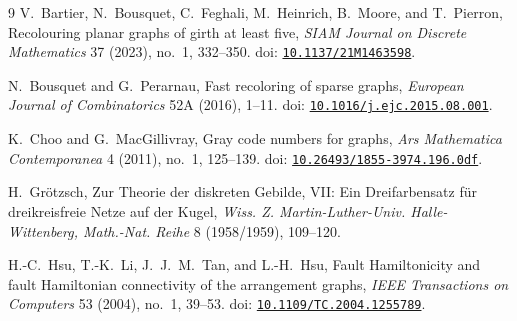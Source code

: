 \documentclass[11pt]{article}
\newcommand{\doi}[1]{doi: \href{https://doi.org/#1}{\nolinkurl{#1}}}
\theoremstyle{remark}
\numberwithin{equation}{section}
\numberwithin{table}{section}
\begin{document}
\begin{thebibliography}{9}
V.~Bartier, N.~Bousquet, C.~Feghali, M.~Heinrich, B.~Moore, and T.~Pierron,
\newblock Recolouring planar graphs of girth at least five,
\newblock \emph{SIAM Journal on Discrete Mathematics} 37 (2023), no.~1, 332--350.
\newblock \doi{10.1137/21M1463598}.

N.~Bousquet and G.~Perarnau,
\newblock Fast recoloring of sparse graphs,
\newblock \emph{European Journal of Combinatorics} 52A (2016), 1--11.
\newblock \doi{10.1016/j.ejc.2015.08.001}.

K.~Choo and G.~MacGillivray,
\newblock Gray code numbers for graphs,
\newblock \emph{Ars Mathematica Contemporanea} 4 (2011), no.~1, 125--139.
\newblock \doi{10.26493/1855-3974.196.0df}.

H.~Gr\"otzsch,
\newblock Zur Theorie der diskreten Gebilde, VII: Ein Dreifarbensatz f\"ur dreikreisfreie Netze auf der Kugel,
\newblock \emph{Wiss. Z. Martin-Luther-Univ. Halle-Wittenberg, Math.-Nat. Reihe} 8 (1958/1959), 109--120.

H.-C.~Hsu, T.-K.~Li, J.~J.~M.~Tan, and L.-H.~Hsu,
\newblock Fault Hamiltonicity and fault Hamiltonian connectivity of the arrangement graphs,
\newblock \emph{IEEE Transactions on Computers} 53 (2004), no.~1, 39--53.
\newblock \doi{10.1109/TC.2004.1255789}.

\end{thebibliography}
\end{document}
